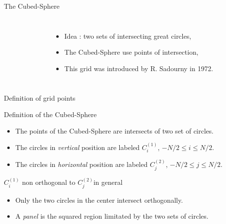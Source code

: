 \documentclass[11pt]{beamer}
\begin{document}
\begin{frame}{The Cubed-Sphere}
\begin{columns}
\begin{figure}
   \def\svgwidth{1 \textwidth}

\end{figure}

\begin{itemize}
\item Idea : two sets of intersecting great circles,
\item The Cubed-Sphere use points of intersection,
\item This grid was introduced by R. Sadourny in 1972.
\end{itemize}
\end{columns}
\end{frame}



\begin{frame}{Definition of grid points}
\begin{block}{Definition of the Cubed-Sphere}
\begin{itemize}
\item The points of the Cubed-Sphere are intersects of two set of circles.
\item The circles in {\sl vertical} position are labeled $C^{(1)}_i$, $-N/2 \leq i\leq N/2$.
\item The circles in {\sl horizontal} position are labeled 
$C^{(2)}_j$, $-N/2 \leq j\leq N/2$.
\end{itemize}
\end{block}

\begin{block}{$C^{(1)}_i$ non orthogonal to $C^{(2)}_j$in general}
\begin{itemize}
\item Only the two circles in the center intersect orthogonally. 
\item A {\sl panel} is the squared region limitated by the two sets of circles. 
\end{itemize}
\end{block}
\end{frame}
\end{document}
